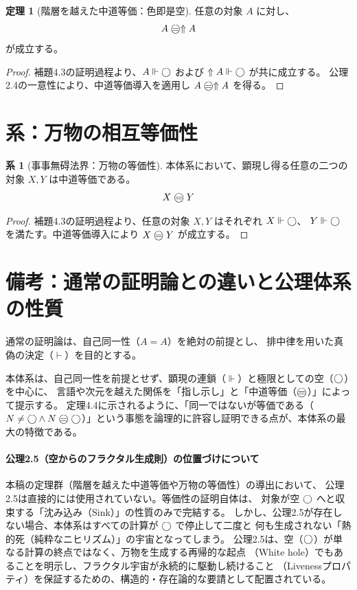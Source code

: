 \documentclass[11pt,a4paper]{article}
\theoremstyle{definition}
\newtheorem{theorem}{定理}[section]
\newtheorem{corollary}{系}[section]
\newcommand{\aletheiai}{\Vdash} %
\begin{document}
\begin{theorem}[階層を越えた中道等価：色即是空]
任意の対象 $A$ に対し、
$$A \mweq \metanegation A$$
が成立する。
\end{theorem}
\begin{proof}
補題4.3の証明過程より、$A \aletheiai \dfix$ および $\metanegation A \aletheiai \dfix$ が共に成立する。
公理2.4の一意性により、中道等価導入を適用し $A \mweq \metanegation A$ を得る。
\end{proof}

\section{系：万物の相互等価性}

\begin{corollary}[事事無碍法界：万物の等価性]
本体系において、顕現し得る任意の二つの対象 $X, Y$ は中道等価である。
$$X \mweq Y$$
\end{corollary}
\begin{proof}
補題4.3の証明過程より、任意の対象 $X, Y$ はそれぞれ $X \aletheiai \dfix$、
$Y \aletheiai \dfix$ を満たす。中道等価導入により $X \mweq Y$ が成立する。
\end{proof}

\section{備考：通常の証明論との違いと公理体系の性質}

通常の証明論は、自己同一性（$A = A$）を絶対の前提とし、
排中律を用いた真偽の決定（$\vdash$）を目的とする。

本体系は、自己同一性を前提とせず、顕現の連鎖（$\aletheiai$）と極限としての空（$\bigcirc$）を中心に、
言語や次元を越えた関係を「指し示し」と「中道等価（$\mweq$）」によって提示する。
定理4.4に示されるように、「同一ではないが等価である（$N \neq \dfix \land N \mweq \dfix$）」という事態を論理的に許容し証明できる点が、本体系の最大の特徴である。

\paragraph{公理2.5（空からのフラクタル生成則）の位置づけについて}
本稿の定理群（階層を越えた中道等価や万物の等価性）の導出において、
公理2.5は直接的には使用されていない。等価性の証明自体は、
対象が空 $\bigcirc$ へと収束する「沈み込み（Sink）」の性質のみで完結する。
しかし、公理2.5が存在しない場合、本体系はすべての計算が $\bigcirc$ で停止して二度と
何も生成されない「熱的死（純粋なニヒリズム）」の宇宙となってしまう。
公理2.5は、空（$\bigcirc$）が単なる計算の終点ではなく、万物を生成する再帰的な起点
（White hole）でもあることを明示し、フラクタル宇宙が永続的に駆動し続けること
（Livenessプロパティ）を保証するための、構造的・存在論的な要請として配置されている。
\end{document}
